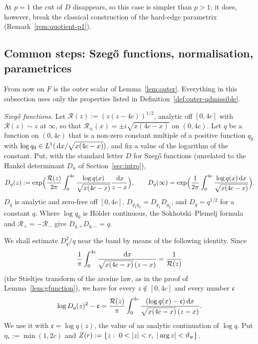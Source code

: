 At $p=1$ the cut of $D$ disappears, so this case is simpler than $p>1$; it does, however, break the classical
construction of the hard-edge parametrix (Remark~\ref{rem:quotient-p1}).

\subsection{\texorpdfstring{Common steps: Szeg\H{o} functions, normalisation, parametrices}{Common steps: Szego functions, normalisation, parametrices}}\label{sec:outer-common}
From now on $F$ is the outer scalar of Lemma~\ref{lem:outer}. Everything in this subsection uses only the properties
listed in Definition~\ref{def:outer-admissible}.

\emph{Szeg\H{o} functions.} Let $\mathcal R(z):=(z(z-4c))^{1/2}$, analytic off $[0,4c]$ with $\mathcal R(z)\sim z$ at
$\infty$, so that $\mathcal R_\pm(x)=\pm i\sqrt{x(4c-x)}$ on $(0,4c)$. Let $q$ be a function on $(0,4c)$ that is a
non-zero constant multiple of a positive function $q_0$ with $\log q_0\in L^1(\,\mathrm{d} x/\sqrt{x(4c-x)})$, and fix a value
of the logarithm of the constant. Put, with the standard letter $D$ for Szeg\H{o} functions (unrelated to the Hankel determinant $D_n$ of Section~\ref{sec:intro}),
\begin{equation}\label{eq:szego}
  D_q(z):=\exp\Bigl(\frac{\mathcal R(z)}{2\pi}\int_0^{4c}\frac{\log q(x)}{\sqrt{x(4c-x)}}\frac{\,\mathrm{d} x}{z-x}\Bigr),\qquad
  D_q(\infty)=\exp\Bigl(\frac1{2\pi}\int_0^{4c}\frac{\log q(x)\,\mathrm{d} x}{\sqrt{x(4c-x)}}\Bigr).
\end{equation}
$D_q$ is analytic and zero-free off $[0,4c]$, $D_{q_1q_2}=D_{q_1}D_{q_2}$, and $D_q=q^{1/2}$ for a constant $q$. Where
$\log q_0$ is H\"older continuous, the Sokhotski--Plemelj formula and $\mathcal R_+=-\mathcal R_-$ give $D_{q,+}D_{q,-}=q$.

We shall estimate $D_q^2/q$ near the band by means of the following identity. Since
\[
  \frac1\pi\int_0^{4c}\frac{\,\mathrm{d} x}{\sqrt{x(4c-x)}\,(z-x)}=\frac1{\mathcal R(z)}
\]
(the Stieltjes transform of the arcsine law, as in the proof of Lemma~\ref{lem:gfunction}), we have for every
$z\notin[0,4c]$ and every number $\mathfrak c$
\begin{equation}\label{eq:szego-repr}
  \log D_q(z)^2-\mathfrak c=\frac{\mathcal R(z)}\pi\int_0^{4c}\frac{(\log q(x)-\mathfrak c)\,\mathrm{d} x}{\sqrt{x(4c-x)}\,(z-x)} .
\end{equation}
We use it with $\mathfrak c=\log q(z)$, the value of an analytic continuation of $\log q$. Put $\eta_*:=\min(1,2c)$ and
$Z(r):=\{z:\ 0<|z|<r,\ |\arg z|<\thw\}$.

